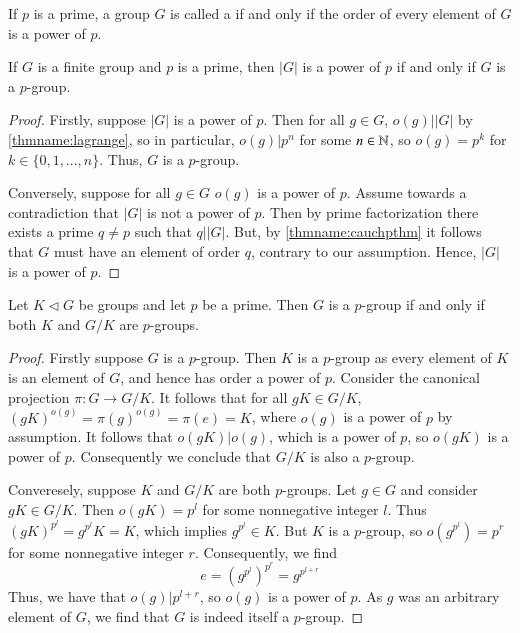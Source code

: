 \documentclass[12pt, a4paper, oneside, openright, titlepage]{book}
\begin{document}
\begin{defn}
    If $p$ is a prime, a group $G$ is called a  if and only if the order of every element of $G$ is a power of $p$.
\end{defn}

\begin{lem}
    If $G$ is a finite group and $p$ is a prime, then $|G|$ is a power of $p$ if and only if $G$ is a $p$-group.
\end{lem}
\begin{proof}
    Firstly, suppose $|G|$ is a power of $p$. Then for all $g \in G$, $o(g)\vert |G|$ by \ref{thmname:lagrange}, so in particular, $o(g)\vert p^n$ for some $n \in \mathbb N$, so $o(g) = p^k$ for $k \in \{0,1,...,n\}$. Thus, $G$ is a $p$-group.

    Conversely, suppose for all $g \in G$ $o(g)$ is a power of $p$. Assume towards a contradiction that $|G|$ is not a power of $p$. Then by prime factorization there exists a prime $q \neq p$ such that $q \vert |G|$. But, by \ref{thmname:cauchpthm} it follows that $G$ must have an element of order $q$, contrary to our assumption. Hence, $|G|$ is a power of $p$.
\end{proof}


\begin{thm}
    Let $K \vartriangleleft G$ be groups and let $p$ be a prime. Then $G$ is a $p$-group if and only if both $K$ and $G/K$ are $p$-groups.
\end{thm}
\begin{proof}
    Firstly suppose $G$ is a $p$-group. Then $K$ is a $p$-group as every element of $K$ is an element of $G$, and hence has order a power of $p$. Consider the canonical projection $\pi:G\rightarrow G/K$. It follows that for all $gK \in G/K$, $(gK)^{o(g)} = \pi(g)^{o(g)} = \pi(e) = K$, where $o(g)$ is a power of $p$ by assumption. It follows that $o(gK)\vert o(g)$, which is a power of $p$, so $o(gK)$ is a power of $p$. Consequently we conclude that $G/K$ is also a $p$-group.

    Converesely, suppose $K$ and $G/K$ are both $p$-groups. Let $g \in G$ and consider $gK \in G/K$. Then $o(gK) = p^l$ for some nonnegative integer $l$. Thus $(gK)^{p^l} = g^{p^l}K = K$, which implies $g^{p^l} \in K$. But $K$ is a $p$-group, so $o(g^{p^l}) = p^r$ for some nonnegative integer $r$. Consequently, we find $$e = (g^{p^l})^{p^r} = g^{p^{l+r}}$$
    Thus, we have that $o(g)\vert p^{l+r}$, so $o(g)$ is a power of $p$. As $g$ was an arbitrary element of $G$, we find that $G$ is indeed itself a $p$-group.
\end{proof}
\end{document}

